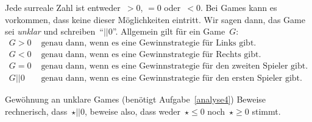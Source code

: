 \documentclass{zirkelblatt}
\newcommand{\fuzzy}{\mathrel{||}}
\begin{document}
Jede surreale Zahl ist entweder~$> 0$, $= 0$ oder~$< 0$. Bei Games kann es
vorkommen, dass keine dieser Möglichkeiten eintritt. Wir sagen dann, das Game
sei \emph{unklar} und schreiben~"`$\fuzzy 0$"'. Allgemein gilt für ein Game~$G$:
\begin{align*}
  G > 0 &\text{ genau dann, wenn es eine Gewinnstrategie für Links gibt.} \\
  G < 0 &\text{ genau dann, wenn es eine Gewinnstrategie für Rechts gibt.} \\
  G = 0 &\text{ genau dann, wenn es eine Gewinnstrategie für den zweiten Spieler gibt.} \\
  G \fuzzy 0 &\text{ genau dann, wenn es eine Gewinnstrategie für den ersten Spieler gibt.}
\end{align*}

\begin{aufgabe}{Gewöhnung an unklare Games (benötigt Aufgabe~\ref{analyse4})}
Beweise rechnerisch, dass~$\star \fuzzy 0$, beweise also, dass weder~$\star
\leq 0$ noch~$\star \geq 0$ stimmt.
\end{aufgabe}
\end{document}

